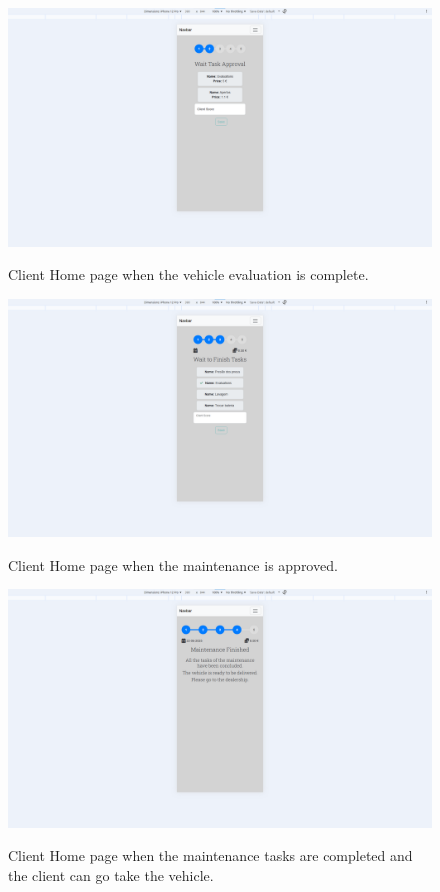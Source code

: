 \begin{figure}[h]
  \caption{Client Home page when the vehicle evaluation is complete.}
  \centering
  \includegraphics[width=\textwidth]{figs/Implementation/client/MaintenanceState2}
  \label{fig:MaintenanceState2}
\end{figure}

\begin{figure}[h]
  \caption{Client Home page when the maintenance is approved.}
  \centering
  \includegraphics[width=\textwidth]{figs/Implementation/client/MaintenanceState3}
  \label{fig:MaintenanceState3}
\end{figure}


\begin{figure}[h]
  \caption{Client Home page when the maintenance tasks are completed and the client can go take the vehicle.}
  \centering
  \includegraphics[width=\textwidth]{figs/Implementation/client/MaintenanceState4}
  \label{fig:MaintenanceState4}
\end{figure}


